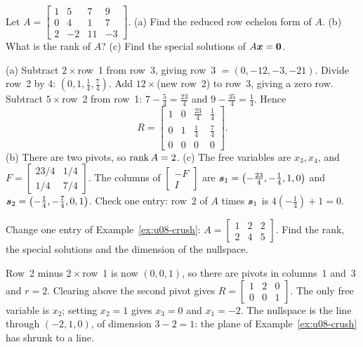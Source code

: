 \begin{exercise}\label{exr:u08-rref}
Let $A=\begin{bmatrix}1&5&7&9\\0&4&1&7\\2&-2&11&-3\end{bmatrix}$. (a) Find the reduced row
echelon form of $A$. (b) What is the rank of $A$? (c) Find the special solutions of
$A\boldsymbol{x}=\boldsymbol{0}$.
\end{exercise}
\begin{solution}
(a) Subtract $2\times$row~1 from row~3, giving row~3 $=(0,-12,-3,-21)$. Divide row~2 by $4$:
$(0,1,\tfrac14,\tfrac74)$. Add $12\times$(new row~2) to row~3, giving a zero row. Subtract
$5\times$row~2 from row~1: $7-\tfrac54=\tfrac{23}{4}$ and $9-\tfrac{35}{4}=\tfrac14$. Hence
\[
R=\begin{bmatrix}1&0&\tfrac{23}{4}&\tfrac14\\[2pt]0&1&\tfrac14&\tfrac74\\[2pt]0&0&0&0\end{bmatrix}.
\]
(b) There are two pivots, so $\operatorname{rank} A=2$.
(c) The free variables are $x_3,x_4$, and $F=\begin{bmatrix}23/4&1/4\\1/4&7/4\end{bmatrix}$.
The columns of $\begin{bmatrix}-F\\I\end{bmatrix}$ are
$\boldsymbol{s}_1=\bigl(-\tfrac{23}{4},-\tfrac14,1,0\bigr)$ and $\boldsymbol{s}_2=\bigl(-\tfrac14,-\tfrac74,0,1\bigr)$.
Check one entry: row~2 of $A$ times $\boldsymbol{s}_1$ is $4(-\tfrac14)+1=0$.
\end{solution}

\begin{exercise}\label{exr:u08-change}
Change one entry of Example~\ref{ex:u08-crush}: $A=\begin{bmatrix}1&2&2\\2&4&5\end{bmatrix}$.
Find the rank, the special solutions and the dimension of the nullspace.
\end{exercise}
\begin{solution}
Row~2 minus $2\times$row~1 is now $(0,0,1)$, so there are pivots in columns~1 and~3 and $r=2$.
Clearing above the second pivot gives $R=\begin{bmatrix}1&2&0\\0&0&1\end{bmatrix}$. The only free
variable is $x_2$; setting $x_2=1$ gives $x_3=0$ and $x_1=-2$. The nullspace is the line through
$(-2,1,0)$, of dimension $3-2=1$: the plane of Example~\ref{ex:u08-crush} has shrunk to a line.
\end{solution}

